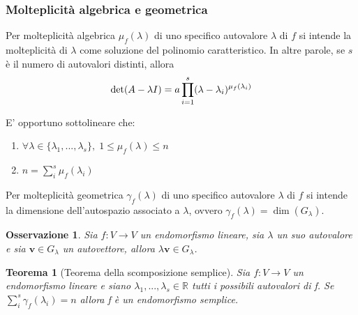 \documentclass{article}
\newtheorem{theorem}{Teorema}
\newtheorem{osservazione}{Osservazione}
\begin{document}
    \vspace{10pt} 
    \subsubsection{Molteplicità algebrica e geometrica} \label{subsubsec:linappmultiplicity}
    Per molteplicità algebrica $\mu_f(\lambda)$ di uno specifico autovalore $\lambda$ di $f$ si intende la molteplicità di $\lambda$ come soluzione 
    del polinomio caratteristico. In altre parole, se $s$ è il numero di autovalori distinti, allora
    \[
        \textnormal{det}(A - \lambda I) = a \displaystyle \prod_{i = 1}^{s} (\lambda - \lambda_i)^{\mu_f(\lambda_i)}
    \]

    E' opportuno sottolineare che: 
    \begin{enumerate}[label=(\arabic*)]
        \item $\forall \lambda \in \{\lambda_1, ..., \lambda_s\}, \; 1 \leq \mu_f(\lambda) \leq n$ 
        \item $n = \displaystyle \sum_{i}^{s} \mu_f(\lambda_i)$
    \end{enumerate}

    \vspace{10pt}
    Per molteplicità geometrica $\gamma_{f}(\lambda)$ di uno specifico autovalore $\lambda$ di $f$ si intende la dimensione dell'autospazio associato a $\lambda$, ovvero $\gamma_{f}(\lambda) = \dim(G_{\lambda})$.

    \vspace{10pt}
    \begin{osservazione}
        Sia $f: V \rightarrow V$ un endomorfismo lineare, sia $\lambda$ un suo autovalore e sia $\mathbf{v} \in G_{\lambda}$ un autovettore, allora $\lambda \mathbf{v} \in G_{\lambda}$.
    \end{osservazione}

    \vspace{10pt}
    \begin{theorem}[Teorema della scomposizione semplice] \label{thm:simple_decomposition}
        Sia $f : V \rightarrow V$ un endomorfismo lineare e siano $\lambda_1, ..., \lambda_s \in \mathbb{R}$ tutti i possibili autovalori di f. Se $\sum_{i}^{s} \gamma_f(\lambda_i) = n$ allora f è un endomorfismo semplice.
    \end{theorem}
\end{document}
